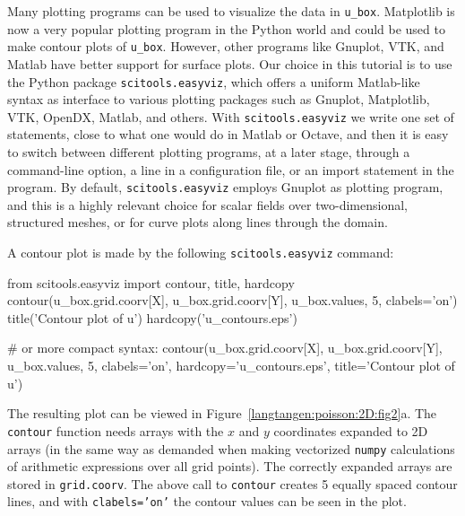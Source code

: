 Many plotting programs can be used to visualize the data in
{\fontsize{10pt}{10pt}\verb!u_box!}.  Matplotlib is now a very popular plotting program in
the Python world and could be used to make contour plots of
{\fontsize{10pt}{10pt}\verb!u_box!}. However, other programs like Gnuplot, VTK, and Matlab have better
support for surface plots. Our choice in this tutorial is to use the
Python package {\fontsize{10pt}{10pt}\texttt{scitools.easyviz}}, which offers a uniform
Matlab-like syntax as interface to various plotting packages such as Gnuplot,
Matplotlib, VTK, OpenDX, Matlab, and others. With {\fontsize{10pt}{10pt}\texttt{scitools.easyviz}} we
write one set of statements, close to what one would do in Matlab or
Octave, and then it is easy to switch between different plotting
programs, at a later stage, through a command-line option, a line in a
configuration file, or an import statement in the program.  By
default, {\fontsize{10pt}{10pt}\texttt{scitools.easyviz}} employs Gnuplot as plotting program,
and this is a highly relevant choice for scalar fields over two-dimensional,
structured meshes, or for curve plots along lines through the domain.

A contour plot is made by the following {\fontsize{10pt}{10pt}\texttt{scitools.easyviz}} command:
\begin{python}
from scitools.easyviz import contour, title, hardcopy
contour(u_box.grid.coorv[X], u_box.grid.coorv[Y], u_box.values, 
        5, clabels='on')
title('Contour plot of u')
hardcopy('u_contours.eps') 

# or more compact syntax:
contour(u_box.grid.coorv[X], u_box.grid.coorv[Y], u_box.values,
        5, clabels='on',
        hardcopy='u_contours.eps', title='Contour plot of u')
\end{python}
The resulting plot can be viewed in Figure~\ref{langtangen:poisson:2D:fig2}a.
The {\fontsize{10pt}{10pt}\texttt{contour}} function needs arrays with the $x$ and $y$ coordinates
expanded to 2D arrays (in the same way as demanded when
making vectorized
{\fontsize{10pt}{10pt}\texttt{numpy}} calculations of arithmetic expressions over all grid points).
The correctly expanded arrays are stored in {\fontsize{10pt}{10pt}\texttt{grid.coorv}}.
The above call to
{\fontsize{10pt}{10pt}\texttt{contour}} creates 5 equally spaced contour lines, and with
{\fontsize{10pt}{10pt}\texttt{clabels='on'}} the contour values can be seen in the plot.

